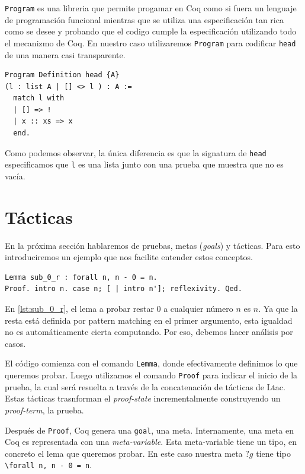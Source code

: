 \lstinline{Program} es una libreria que permite progamar en Coq como si fuera un lenguaje de programación funcional mientras que se utiliza una especificación tan rica como se desee y probando que el codigo cumple la especificación utilizando todo el mecanizmo de Coq. En nuestro caso utilizaremos \lstinline{Program} para codificar \lstinline{head} de una manera casi transparente.
\begin{lstlisting}
Program Definition head {A}
(l : list A | [] <> l ) : A :=
  match l with
  | [] => !
  | x :: xs => x
  end.
\end{lstlisting}
Como podemos observar, la única diferencia es que la signatura de \lstinline{head} especificamos que \lstinline{l} es una lista junto con una prueba que muestra que no es vacía.

\section{Tácticas}

En la próxima sección hablaremos de pruebas, metas (\textit{goals}) y tácticas. Para esto introduciremos un ejemplo que nos facilite entender estos conceptos.
\begin{lstlisting}[float=h,frame=tb,caption={Teorema y prueba en Coq},label=lst:sub_0_r]
Lemma sub_0_r : forall n, n - 0 = n.
Proof. intro n. case n; [ | intro n']; reflexivity. Qed. 
\end{lstlisting}
En \ref{lst:sub_0_r}, el lema a probar restar 0 a cualquier número $n$ es $n$. Ya que la resta está definida por pattern matching en el primer argumento, esta igualdad no es automáticamente cierta computando. Por eso, debemos hacer análisis por casos.

El código comienza con el comando \lstinline{Lemma}, donde efectivamente definimos lo que queremos probar.
Luego utilizamos el comando \lstinline{Proof} para indicar el inicio de la prueba, la cual será resuelta a través de la concatenación de tácticas de Ltac. Estas tácticas trasnforman el \textit{proof-state} incrementalmente construyendo un \textit{proof-term}, la prueba.

Después de \lstinline{Proof}, Coq genera una \lstinline{goal}, una meta. Internamente, una meta en Coq es representada con una \textit{meta-variable}. Esta meta-variable tiene un tipo, en concreto el lema que queremos probar. En este caso nuestra meta $?g$ tiene tipo \lstinline{\forall n, n - 0 = n}.

